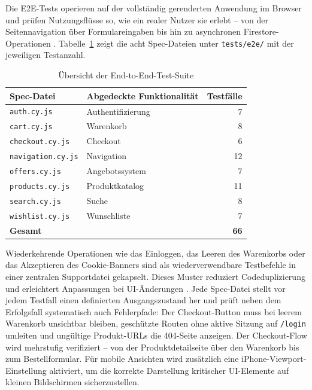 Die E2E-Tests operieren auf der vollständig gerenderten Anwendung im Browser und prüfen Nutzungsflüsse so, wie ein realer Nutzer sie erlebt -- von der Seitennavigation über Formulareingaben bis hin zu asynchronen Firestore-Operationen \cite{mwaura2021, vieira2025}. Tabelle~\ref{tab:e2e-tests} zeigt die acht Spec-Dateien unter \texttt{tests/e2e/} mit der jeweiligen Testanzahl.

\begin{table}[H]
\centering
\begin{tabular}{llr}
\toprule
\textbf{Spec-Datei} & \textbf{Abgedeckte Funktionalität} & \textbf{Testfälle} \\
\midrule
\texttt{auth.cy.js}       & Authentifizierung  &  7 \\
\texttt{cart.cy.js}       & Warenkorb          &  8 \\
\texttt{checkout.cy.js}   & Checkout           &  6 \\
\texttt{navigation.cy.js} & Navigation         & 12 \\
\texttt{offers.cy.js}     & Angebotssystem     &  7 \\
\texttt{products.cy.js}   & Produktkatalog     & 11 \\
\texttt{search.cy.js}     & Suche              &  8 \\
\texttt{wishlist.cy.js}   & Wunschliste        &  7 \\
\midrule
\textbf{Gesamt}           &                    & \textbf{66} \\
\bottomrule
\end{tabular}
\caption{Übersicht der End-to-End-Test-Suite}
\label{tab:e2e-tests}
\end{table}

Wiederkehrende Operationen wie das Einloggen, das Leeren des Warenkorbs oder das Akzeptieren des Cookie-Banners sind als wiederverwendbare Testbefehle in einer zentralen Supportdatei gekapselt. Dieses Muster reduziert Codeduplizierung und erleichtert Anpassungen bei UI-Änderungen \cite{cypress2025, vieira2025}. Jede Spec-Datei stellt vor jedem Testfall einen definierten Ausgangszustand her und prüft neben dem Erfolgsfall systematisch auch Fehlerpfade: Der Checkout-Button muss bei leerem Warenkorb unsichtbar bleiben, geschützte Routen ohne aktive Sitzung auf \texttt{/login} umleiten und ungültige Produkt-URLs die 404-Seite anzeigen. Der Checkout-Flow wird mehrstufig verifiziert -- von der Produktdetailseite über den Warenkorb bis zum Bestellformular. Für mobile Ansichten wird zusätzlich eine iPhone-Viewport-Einstellung aktiviert, um die korrekte Darstellung kritischer UI-Elemente auf kleinen Bildschirmen sicherzustellen.

